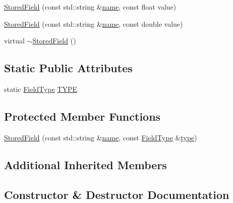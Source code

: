 \begin{DoxyCompactItemize}
\mbox{\hyperlink{classlucene_1_1core_1_1document_1_1StoredField_ac021b20892199399680b9d616f3a1889}{Stored\+Field}} (const std\+::string \&\mbox{\hyperlink{classlucene_1_1core_1_1document_1_1Field_a52f673f3b3abb14b180f5159f4726537}{name}}, const float value)
\item 
\mbox{\hyperlink{classlucene_1_1core_1_1document_1_1StoredField_a072f406b9425f12e85b2a784438961e9}{Stored\+Field}} (const std\+::string \&\mbox{\hyperlink{classlucene_1_1core_1_1document_1_1Field_a52f673f3b3abb14b180f5159f4726537}{name}}, const double value)
\item 
virtual \mbox{\hyperlink{classlucene_1_1core_1_1document_1_1StoredField_a895d5fb1c954aa47252748a8e7e4e3a4}{$\sim$\+Stored\+Field}} ()
\end{DoxyCompactItemize}
\subsection*{Static Public Attributes}
\begin{DoxyCompactItemize}
\item 
static \mbox{\hyperlink{classlucene_1_1core_1_1document_1_1FieldType}{Field\+Type}} \mbox{\hyperlink{classlucene_1_1core_1_1document_1_1StoredField_aab3b91f6faee4a11cb0553bf576a55ba}{T\+Y\+PE}}
\end{DoxyCompactItemize}
\subsection*{Protected Member Functions}
\begin{DoxyCompactItemize}
\item 
\mbox{\hyperlink{classlucene_1_1core_1_1document_1_1StoredField_a941109198ad8fe7c8495bb1cdab4c80b}{Stored\+Field}} (const std\+::string \&\mbox{\hyperlink{classlucene_1_1core_1_1document_1_1Field_a52f673f3b3abb14b180f5159f4726537}{name}}, const \mbox{\hyperlink{classlucene_1_1core_1_1document_1_1FieldType}{Field\+Type}} \&\mbox{\hyperlink{classlucene_1_1core_1_1document_1_1Field_a7d5849d933ebde73422710069643ccff}{type}})
\end{DoxyCompactItemize}
\subsection*{Additional Inherited Members}


\subsection{Constructor \& Destructor Documentation}
\mbox{\label{classlucene_1_1core_1_1document_1_1StoredField_a941109198ad8fe7c8495bb1cdab4c80b}} 
